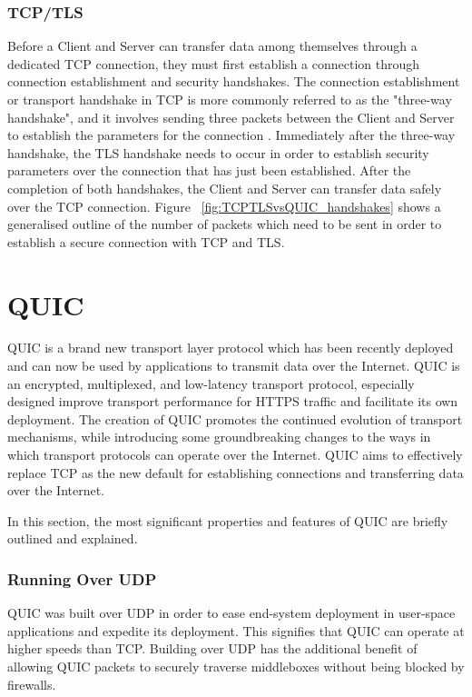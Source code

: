 \documentclass{l4proj}
\begin{document}
\subsubsection{TCP/TLS} Before a Client and Server can transfer data among themselves through a dedicated TCP connection, they must first establish a connection through connection establishment and security handshakes. The connection establishment or transport handshake in TCP is more commonly referred to as the "three-way handshake", and it involves sending three packets between the Client and Server to establish the parameters for the connection \citep{Rahoum2020}. Immediately after the three-way handshake, the TLS handshake needs to occur in order to establish security parameters over the connection that has just been established. After the completion of both handshakes, the Client and Server can transfer data safely over the TCP connection. Figure ~\ref{fig:TCPTLSvsQUIC_handshakes} shows a generalised outline of the number of packets which need to be sent in order to establish a secure connection with TCP and TLS.


\section{QUIC}

QUIC is a brand new transport layer protocol which has been recently deployed and can now be used by applications to transmit data over the Internet. QUIC is an encrypted, multiplexed, and low-latency transport protocol, especially designed improve transport performance for HTTPS traffic and facilitate its own deployment. The creation of QUIC promotes the continued evolution of transport mechanisms, while introducing some groundbreaking changes to the ways in which transport protocols can operate over the Internet. QUIC aims to effectively replace TCP as the new default for establishing connections and transferring data over the Internet.

In this section, the most significant properties and features of QUIC are briefly outlined and explained.

\subsubsection{Running Over UDP} QUIC was built over UDP in order to ease end-system deployment in user-space applications and expedite its deployment. This signifies that QUIC can operate at higher speeds than TCP. Building over UDP has the additional benefit of allowing QUIC packets to securely traverse middleboxes without being blocked by firewalls. 
\end{document}
